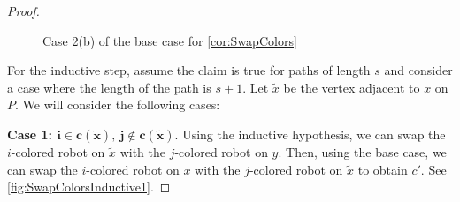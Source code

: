 \documentclass{amsart}
\newcommand{\vertex}[3][1]{
\node [circle,  fill, inner sep = 0pt,outer sep = 0pt, minimum size=#1mm] (#3) at #2 {};
}
\newcommand{\fg}[1]{
    \pgfdeclarelayer{foreground}
    \pgfsetlayers{main,foreground}
    \begin{pgfonlayer}{foreground}
    #1
    \end{pgfonlayer}
    }
\newcommand{\RedRobot}[2]{
\node [rectangle, cbred, fill, inner sep = 0pt,outer sep = 1pt, minimum size=2.3mm] (#2) at #1 {};
}
\newcommand{\GreenRobot}[2]{
\node [diamond, cbgreen, fill, inner sep = 0pt,outer sep = 1pt,minimum size=3mm] (#2) at #1 {};
}
\newcommand{\BlueRobot}[2]{
\node [isosceles triangle, shape border rotate=90,cbblue, fill, inner sep = 0pt,outer sep = 1pt,minimum size=2.5mm] (#2) at #1 {};
}
\theoremstyle{definition}
\theoremstyle{remark}
\begin{document}
\begin{proof}
\begin{figure}[h!]
    \quad
    \caption{Case 2(b) of the base case for \cref{cor:SwapColors}}
    \label{fig:SwapColorsBase2b}
\end{figure}

For the inductive step, assume the claim is true for paths of length $s$ and consider a case where the length of the path is $s+1$. Let $\tilde x$ be the vertex adjacent to $x$ on $P$. We will consider the following cases:

\textbf{Case 1: $\boldsymbol{i\in c(\tilde x),\ j\notin c(\tilde x)}$}. Using the inductive hypothesis, we can swap the $i$-colored robot on $\tilde x$ with the $j$-colored robot on $y$. Then, using the base case, we can swap the $i$-colored robot on $x$ with the $j$-colored robot on $\tilde x$ to obtain $c'$.  See \cref{fig:SwapColorsInductive1}.


\end{proof}
\end{document}
